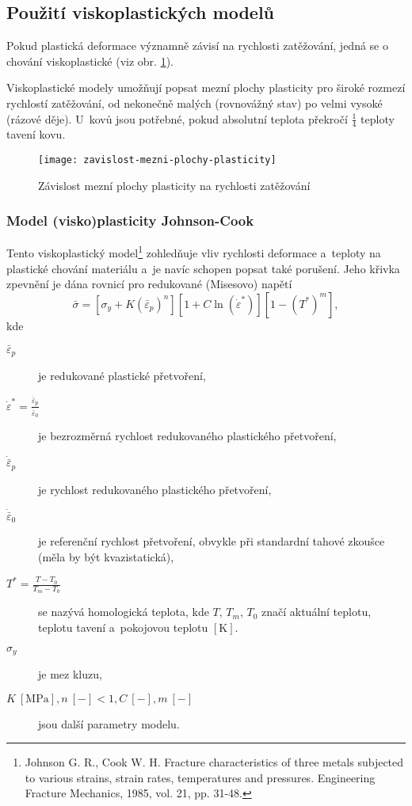 
\subsection{Použití viskoplastických modelů}
Pokud plastická deformace významně závisí na rychlosti zatěžování, jedná se o chování viskoplastické (viz obr. \ref{fig:zavislost-mezni-plochy-plasticity}).

Viskoplastické modely umožňují popsat mezní plochy plasticity pro široké rozmezí rychlostí zatěžování,
od nekonečně malých (rovnovážný stav) po velmi vysoké (rázové děje).
U~kovů jsou potřebné, pokud absolutní teplota překročí $\frac{1}{4}$ teploty tavení kovu. 

\begin{figure}
	\label{fig:zavislost-mezni-plochy-plasticity}
	\centering
	\texttt{[image: zavislost-mezni-plochy-plasticity]}
	\caption{Závislost mezní plochy plasticity na rychlosti zatěžování}
\end{figure}

\subsubsection{Model (visko)plasticity Johnson-Cook}\label{sec:johnson-cook-viskoplasticita}
Tento viskoplastický model\footnote{Johnson G. R., Cook W. H. Fracture characteristics of three metals subjected to various strains, strain rates, temperatures and pressures. Engineering Fracture Mechanics, 1985, vol. 21, pp. 31-48.} zohledňuje vliv rychlosti deformace a~teploty na plastické chování materiálu a~je navíc schopen popsat také porušení.
Jeho křivka zpevnění je dána rovnicí pro redukované (Misesovo) napětí
\begin{equation}
	\bar{\sigma} = \left[ \sigma_y + K (\bar{\varepsilon}_p)^n \right] \left[ 1 + C \ln(\dot{\varepsilon}^*) \right] \left[ 1 - (T^*)^m \right],
\end{equation}
kde
\begin{description}
	\item[$\bar{\varepsilon}_p$] je redukované plastické přetvoření,  
	\item[$\dot{\varepsilon}^* = \tfrac{\dot{\bar{\varepsilon}}_p}{\dot{\bar{\varepsilon}}_0}$] je bezrozměrná rychlost redukovaného plastického přetvoření,
	\item[$\dot{\bar{\varepsilon}}_p$] je rychlost redukovaného plastického přetvoření,
	\item[$\dot{\bar{\varepsilon}}_0$] je referenční rychlost přetvoření, obvykle při standardní tahové zkoušce (měla by být kvazistatická),
	\item[$T^* = \tfrac{T-T_0}{T_m-T_0}$] se nazývá homologická teplota, kde 
	$T$, $T_m$, $T_0$ značí aktuální teplotu, teplotu tavení a~pokojovou teplotu $[\si{\kelvin}]$.
	\item[$\sigma_y$] je mez kluzu,
	\item[{$K\:[\si{\mega\pascal}], n\:[-]<1, C\:[-], m\:[-]$}] jsou další parametry modelu.
\end{description}

